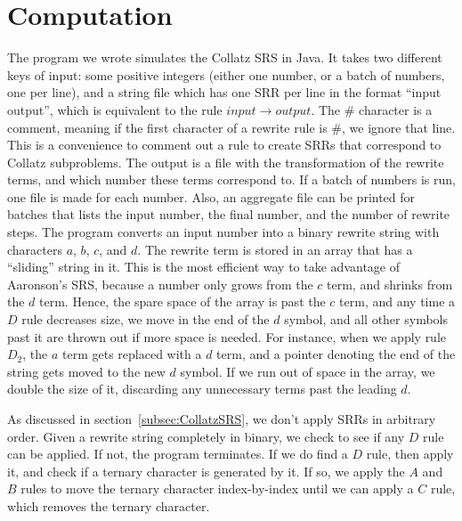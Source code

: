 \section{Computation} \label{subsec:rewritecomp}
The program we wrote simulates the Collatz SRS in Java. It takes two different keys of input: some positive integers (either one number, or a batch of numbers, one per line), and a string file which has one SRR per line in the format ``input output'', which is equivalent to the rule $input \rightarrow output$. The \# character is a comment, meaning if the first character of a rewrite rule is \#, we ignore that line. This is a convenience to comment out a rule to create SRRs that correspond to Collatz subproblems. The output is a file with the transformation of the rewrite terms, and which number these terms correspond to. If a batch of numbers is run, one file is made for each number. Also, an aggregate file can be printed for batches that lists the input number, the final number, and the number of rewrite steps.
The program converts an input number into a binary rewrite string with characters $a$, $b$, $c$, and $d$. The rewrite term is stored in an array that has a ``sliding'' string in it. This is the most efficient way to take advantage of Aaronson's SRS, because a number only grows from the $c$ term, and shrinks from the $d$ term. Hence, the spare space of the array is past the $c$ term, and any time a $D$ rule decreases size, we move in the end of the $d$ symbol, and all other symbols past it are thrown out if more space is needed. For instance, when we apply rule $D_2$, the $a$ term gets replaced with a $d$ term, and a pointer denoting the end of the string gets moved to the new $d$ symbol. If we run out of space in the array, we double the size of it, discarding any unnecessary terms past the leading $d$. \par
As discussed in section~\ref{subsec:CollatzSRS}, we don't apply SRRs in arbitrary order. Given a rewrite string completely in binary, we check to see if any $D$ rule can be applied. If not, the program terminates. If we do find a $D$ rule, then apply it, and check if a ternary character is generated by it. If so, we apply the $A$ and $B$ rules to move the ternary character index-by-index until we can apply a $C$ rule, which removes the ternary character. \par

